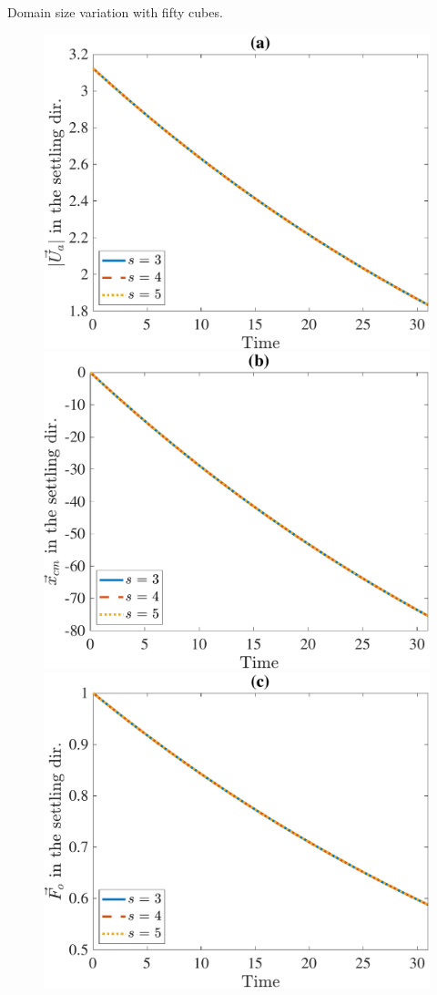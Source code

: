 Domain size variation with fifty cubes.
\begin{figure}[ht]
	\begin{center}
		\includegraphics[scale=0.2]{./figures/fig_NC50_s_Ua3_all}
		\includegraphics[scale=0.2]{./figures/fig_NC50_s_cm3_all}
		\includegraphics[scale=0.2]{./figures/fig_NC50_s_Fo3_all}

\end{center}
\end{figure}
